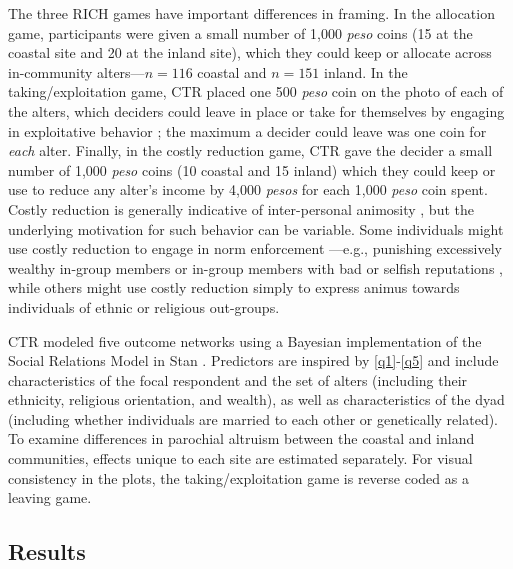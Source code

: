 \documentclass[bibauthoryear]{aa}
\begin{document}
The three RICH games have important differences in framing. In the allocation game, participants were given a small number of 1,000 \textit{peso} coins (15 at the coastal site and 20 at the inland site), which they could keep or allocate across in-community alters---$n=116$ coastal and $n=151$ inland. In the taking/exploitation game, CTR placed one 500 \textit{peso} coin on the photo of each of the alters, which deciders could leave in place or take for themselves by engaging in exploitative behavior \citep{bhui2019exploitation}; the maximum a decider could leave was one coin for \textit{each} alter. Finally, in the costly reduction game, CTR gave the decider a small number of 1,000 \textit{peso} coins (10 coastal and 15 inland) which they could keep or use to reduce any alter's income by 4,000 \textit{pesos} for each 1,000 \textit{peso} coin spent. Costly reduction is generally indicative 
of inter-personal animosity \citep{gervais2017rich}, but the underlying motivation for such behavior can be variable. Some individuals might use costly reduction to engage in  norm enforcement \citep{Fehr2002}---e.g., punishing excessively wealthy in-group members \citep{gervais2017rich, Pisor2020} or in-group members with bad or selfish reputations \citep{bhui2019exploitation}, while others might use costly reduction simply to express animus towards individuals of ethnic or religious out-groups. 

CTR modeled five outcome networks using a Bayesian implementation of the Social Relations Model \citep[SRM,][]{kenny1984social,  koster2019statistical}  in Stan \citep{Rstan2017xx}. Predictors are inspired by \ref{q1}-\ref{q5} and include characteristics of the focal respondent and the set of alters (including their ethnicity, religious orientation, and wealth), as well as characteristics of the dyad (including whether individuals are married to each other or genetically related). To examine differences in parochial altruism between the coastal and inland communities, effects unique to each site are estimated separately. For visual consistency in the plots, the taking/exploitation game is reverse coded as a leaving game. 

\subsection{Results}
\end{document}
